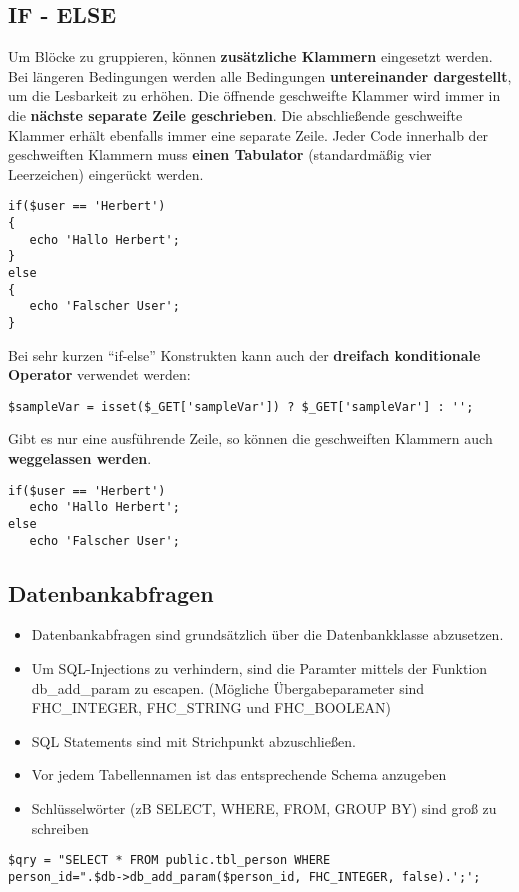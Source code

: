 \subsection{IF - ELSE}
Um Bl\"ocke zu gruppieren, k\"onnen {\bf zus\"atzliche Klammern} eingesetzt werden. Bei l\"angeren Bedingungen werden alle Bedingungen {\bf untereinander dargestellt}, um die Lesbarkeit zu erh\"ohen. Die \"offnende geschweifte Klammer wird immer in die {\bf n\"achste separate Zeile geschrieben}. Die abschlie\ss ende geschweifte Klammer erh\"alt ebenfalls immer eine separate Zeile. Jeder Code innerhalb der geschweiften Klammern muss {\bf einen Tabulator} (standardm\"a\ss ig vier Leerzeichen) einger\"uckt werden. \begin{verbatim}
if($user == 'Herbert')
{
   echo 'Hallo Herbert';
}
else
{
   echo 'Falscher User';
} 
\end{verbatim}
Bei sehr kurzen "`if-else"' Konstrukten kann auch der {\bf dreifach konditionale Operator} verwendet werden:
\begin{verbatim}
$sampleVar = isset($_GET['sampleVar']) ? $_GET['sampleVar'] : '';
\end{verbatim}
Gibt es nur eine ausf\"uhrende Zeile, so k\"onnen die geschweiften Klammern auch {\bf weggelassen werden}.
\begin{verbatim}
if($user == 'Herbert')
   echo 'Hallo Herbert';
else
   echo 'Falscher User';
\end{verbatim}

\subsection{Datenbankabfragen}
\begin{itemize}
\item Datenbankabfragen sind grunds\"atzlich \"uber die Datenbankklasse abzusetzen. 
\item Um SQL-Injections zu verhindern, sind die Paramter mittels der Funktion db\_add\_param zu escapen. 
(M\"ogliche \"Ubergabeparameter sind FHC\_INTEGER, FHC\_STRING und FHC\_BOOLEAN)
\item SQL Statements sind mit Strichpunkt abzuschlie\ss{}en.
\item Vor jedem Tabellennamen ist das entsprechende Schema anzugeben
\item Schl\"usselw\"orter (zB SELECT, WHERE, FROM, GROUP BY) sind gro\ss{} zu schreiben
\end{itemize}
\begin{verbatim}
$qry = "SELECT * FROM public.tbl_person WHERE 
person_id=".$db->db_add_param($person_id, FHC_INTEGER, false).';';
\end{verbatim}

